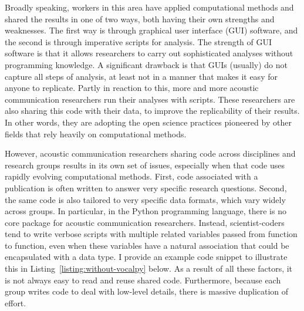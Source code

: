 \documentclass[11pt]{article}
\begin{document}
Broadly speaking, workers in this area have applied computational methods and shared the results in one of two ways, both having their own strengths and weaknesses.
The first way is through graphical user interface (GUI) software, and the second is through imperative scripts for analysis.
The strength of GUI software is that it allows researchers to carry out sophisticated analyses without programming knowledge. 
A significant drawback is that GUIs (usually) do not capture all steps of analysis, at least not in a manner that makes it easy for anyone to replicate.
Partly in reaction to this, 
more and more acoustic communication researchers run their analyses with scripts.
These researchers are also sharing this code with their data, to improve the replicability of their results.
In other words, they are adopting the open science practices pioneered by other fields that rely heavily on computational methods.

However, acoustic communication researchers sharing code across disciplines and research groups results in its own set of issues, especially when that code uses rapidly evolving computational methods.
First, code associated with a publication is often written to answer very specific research questions.
Second, the same code is also tailored to very specific data formats, which vary widely across groups.
In particular, in the Python programming language, there is no core package for acoustic communication researchers. 
Instead, scientist-coders tend to write verbose scripts with multiple related variables passed from function to function, even when these variables have a natural association that could be encapsulated with a data type. I provide an example code snippet to illustrate this in Listing~\ref{listing:without-vocalpy} below.
As a result of all these factors, it is not always easy to read and reuse shared code. 
Furthermore, because each group writes code to deal with low-level details, there is massive duplication of effort.
\end{document}
